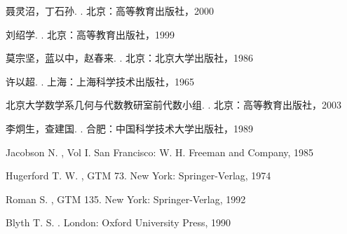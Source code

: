

\begin{thebibliography}{99}

{聂灵沼，丁石孙}.
.
\newblock 北京：高等教育出版社，2000

刘绍学.
.
\newblock 北京：高等教育出版社，1999

{莫宗坚，蓝以中，赵春来}.
.
\newblock 北京：北京大学出版社，1986

许以超.
.
\newblock 上海：上海科学技术出版社，1965

北京大学数学系几何与代数教研室前代数小组.
.
\newblock 北京：高等教育出版社，2003

{李炯生，查建国}.
.
\newblock 合肥：中国科学技术大学出版社，1989

Jacobson N.
, Vol I.
\newblock San Francisco: W. H. Freeman and Company, 1985

Hugerford T. W.
, GTM 73.
\newblock New York: Springer-Verlag, 1974

Roman S.
, GTM 135.
\newblock New York: Springer-Verlag, 1992

Blyth T. S.
.
\newblock London: Oxford University Press, 1990
\end{thebibliography}



\PrintChEndLogo


